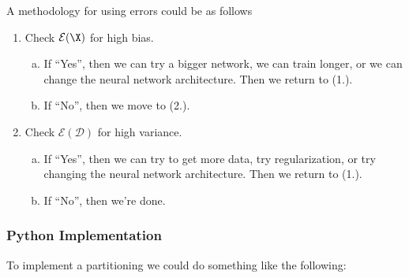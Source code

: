 A methodology for using errors could be as follows
\begin{enumerate}[1.]
	\item Check $\mathcal{E}(\X)$ for high bias.
		\begin{enumerate}[a.]
			\item If ``Yes'', then we can try a bigger network, we can train longer, or we can change the neural network architecture. Then we return to (1.).
			\item If ``No'', then we move to (2.).
		\end{enumerate}
	\item Check $\mathcal{E}(\mathcal{D})$ for high variance.
		\begin{enumerate}[a.]
			\item If ``Yes'', then we can try to get more data, try regularization, or try changing the neural network architecture.  Then we return to (1.).
			\item If ``No'', then we're done.
		\end{enumerate}
\end{enumerate}


\subsubsection{Python Implementation}

To implement a partitioning we could do something like the following:



